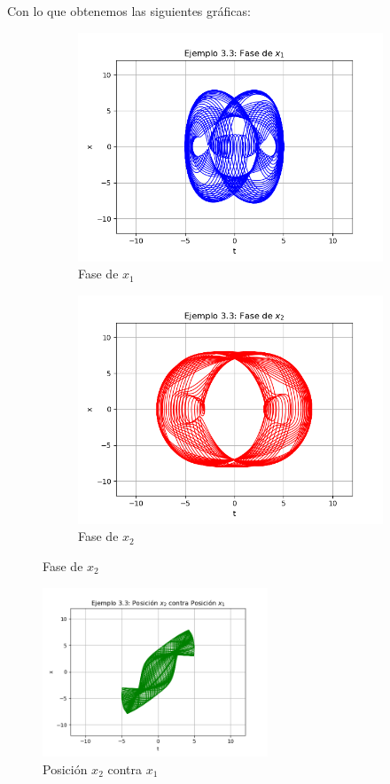 \documentclass[a4paper]{article}
\begin{document}
\begin{center}
Con lo que obtenemos las siguientes gráficas:
\begin{figure}[ht!]
\begin{subfigure}{0.6\textwidth}
  \centering
  \includegraphics[width=0.75\linewidth]{ejemplo_3_3_2.png}
   \caption{Fase de $x_1$}
\end{subfigure}
\begin{subfigure}{0.6\textwidth}
  \centering
  \includegraphics[width=0.75\linewidth]{ejemplo_3_3_3.png}
  \caption{Fase de $x_2$}
\end{subfigure}
\end{figure}
\begin{figure}[ht!]
 \centering
  \includegraphics[width=0.6\textwidth]{ejemplo_3_3_1.png}
  \caption{Posición $x_2$ contra $x_1$}
\end{figure}


\end{center}
\end{document}

